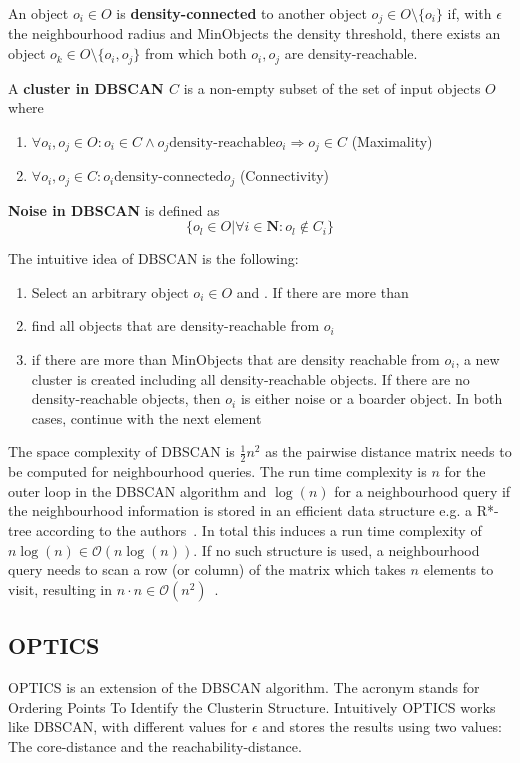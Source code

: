 An object $o_i \in O$ is \textbf{density-connected} to another object $o_j \in O\setminus \{o_i\}$ if, with $\epsilon$ the neighbourhood radius and MinObjects the density threshold, there exists an object $o_k \in O\setminus \{o_i, o_j\}$ from which both $o_i, o_j$ are density-reachable.

A \textbf{cluster in DBSCAN $C$} is a non-empty subset of the set of input objects $O$ where 
\begin{enumerate}
    \item $\forall o_i, o_j \in O: o_i \in C \wedge o_j \text{density-reachable} o_i \Rightarrow o_j \in C$ (Maximality)
    \item $\forall o_i, o_j \in C: o_i \text{density-connected} o_j$ (Connectivity)
\end{enumerate}

\textbf{Noise in DBSCAN} is defined as \[ \{o_l \in O | \forall i \in \mathbf{N}: o_l \not \in C_i \}\]


The intuitive idea of DBSCAN is the following:
\begin{enumerate}
    \item Select an arbitrary object $o_i \in O$ and . If there are more than 
    \item find all objects that are density-reachable from $o_i$
    \item if there are more than MinObjects that are density reachable from $o_i$, a new cluster is created including all density-reachable objects. If there are no density-reachable objects, then $o_i$ is either noise or a boarder object. In both cases, continue with the next element
\end{enumerate}

The space complexity of DBSCAN is $\frac{1}{2}n^2$ as the pairwise distance matrix needs to be computed for neighbourhood queries. The run time complexity is $n$ for the outer loop in the DBSCAN algorithm and $\log(n)$ for a neighbourhood query if the neighbourhood information is stored in an efficient data structure e.g. a R*-tree according to the authors~\cite{dbscan}. In total this induces a run time complexity of $n \log(n) \in \mathcal{O}(n \log(n))$. If no such structure is used, a neighbourhood query needs to scan a row (or column) of the matrix which takes $n$ elements to visit, resulting in $n \cdot n \in \mathcal{O}(n^2)$~\cite{han2011data}. \\

\subsection{OPTICS}\label{\positionnumber}
OPTICS is an extension of the DBSCAN algorithm. The acronym stands for Ordering Points To Identify the Clusterin Structure. Intuitively OPTICS works like DBSCAN, with different values for $\epsilon$ and stores the results using two values: The core-distance and the reachability-distance.

